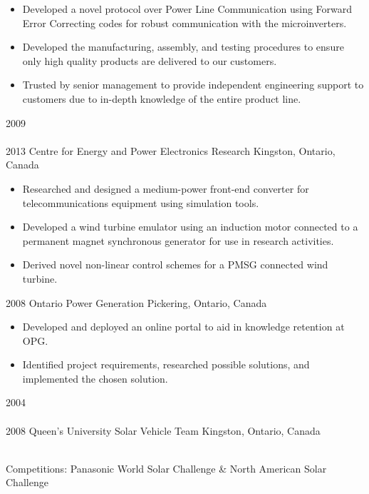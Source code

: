 \begin{entrylist}
{\begin{itemize}[leftmargin=12pt]
	\item Developed a novel protocol over Power Line Communication using Forward Error Correcting codes for robust communication with the microinverters.
	\item Developed the manufacturing, assembly, and testing procedures to ensure only high quality products are delivered to our customers.
	\item Trusted by senior management to provide independent engineering support to customers due to in-depth knowledge of the entire product line.
\end{itemize}
}
\entry
  {2009\\\faChevronDown\\2013}
  {Centre for Energy and Power Electronics Research}
  {Kingston, Ontario, Canada}
  {
  \begin{itemize}[leftmargin=12pt]
    \item Researched and designed a medium-power front-end converter for telecommunications equipment using simulation tools.
    \item Developed a wind turbine emulator using an induction motor connected to a permanent magnet synchronous generator for use in research activities.
    \item Derived novel non-linear control schemes for a PMSG connected wind turbine.
  \end{itemize}}
\entry
  {2008}
  {Ontario Power Generation}
  {Pickering, Ontario, Canada}
  {
  \begin{itemize}[leftmargin=12pt]
    \item Developed and deployed an online portal to aid in knowledge retention at OPG.
    \item Identified project requirements, researched possible solutions, and implemented the chosen solution.
  \end{itemize}
}
\entry
  {2004\\\faChevronDown\\2008}
  {Queen's University Solar Vehicle Team}
  {Kingston, Ontario, Canada}
  {\\
  Competitions: {\bodyfontit Panasonic World Solar Challenge} \&
  {\bodyfontit North American Solar Challenge}
  \begin{itemize}[leftmargin=12pt]

\end{itemize}}
\end{entrylist}
